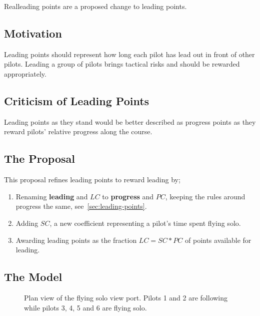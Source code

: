 \documentclass[gap.tex]{subfiles}
\begin{document}
\label{sec:real-leading}
Real\footnotemark leading points are a proposed change to leading points.

\subsection{Motivation}
Leading points should represent how long each pilot has lead out in front of
other pilots. Leading a group of pilots brings tactical risks and should be
rewarded appropriately.

\subsection{Criticism of Leading Points}
Leading points as they stand would be better described as progress points as
they reward pilots' relative progress along the course.

\subsection{The Proposal}
This proposal refines leading points to reward leading by;

\begin{enumerate}
    \item Renaming \textbf{leading} and \(LC\) to \textbf{progress} and \(PC\),
        keeping the rules around progress the same,
        see~\ref{sec:leading-points}.

    \item Adding \(SC\), a new coefficient representing a pilot's time spent
        flying solo.

    \item Awarding leading points as the fraction \(LC = SC * PC\) of points
        available for leading.
\end{enumerate}

\newpage
\subsection{The Model}

\begin{figure}[ht]
    \centering
    
    \caption{Plan view of the flying solo view port. Pilots 1 and 2 are following while pilots 3, 4, 5 and 6 are flying solo.}
    \label{fig:view-port}
\end{figure}
\end{document}
